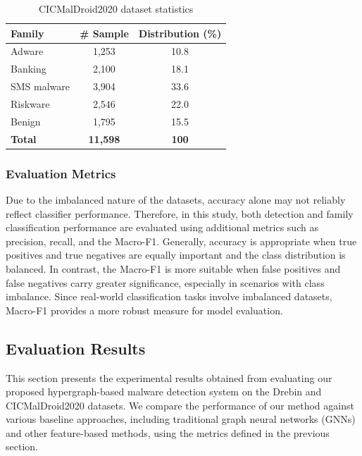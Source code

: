 \documentclass[runningheads]{llncs}
\begin{document}
\begin{table}[h]
\centering
\caption{CICMalDroid2020 dataset statistics}
\label{tab:my-dataset-distribution}
\begin{tabular}{l c @{\hskip 1.0em} c}
\hline
\textbf{Family}    & \textbf{\# Sample}   & \textbf{Distribution (\%)} \\ \hline
Adware               & 1,253             & 10.8                       \\
Banking              & 2,100             & 18.1                       \\
SMS malware          & 3,904             & 33.6                       \\
Riskware             & 2,546             & 22.0                       \\
Benign               & 1,795             & 15.5                       \\ \hline
\textbf{Total}       & \textbf{11,598}   & \textbf{100}             \\ \hline
\end{tabular}
\label{table:CICMalDroid_dataset}
\end{table}

\subsubsection{Evaluation Metrics}
Due to the imbalanced nature of the datasets, accuracy alone may not reliably reflect classifier performance. Therefore, in this study, both detection and family classification performance are evaluated using additional metrics such as precision, recall, and the Macro-F1. Generally, accuracy is appropriate when true positives and true negatives are equally important and the class distribution is balanced. In contrast, the Macro-F1 is more suitable when false positives and false negatives carry greater significance, especially in scenarios with class imbalance. Since real-world classification tasks involve imbalanced datasets, Macro-F1 provides a more robust measure for model evaluation.


\subsection{Evaluation Results}
This section presents the experimental results obtained from evaluating our proposed hypergraph-based malware detection system on the Drebin and CICMalDroid2020 datasets. We compare the performance of our method against various baseline approaches, including traditional graph neural networks (GNNs) and other feature-based methods, using the metrics defined in the previous section.
\end{document}
